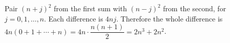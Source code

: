 Pair $(n+j)^2$ from the first sum with $(n-j)^2$ from the second, for $j=0,1,\ldots,n$. Each difference is $4nj$. Therefore the whole difference is $4n(0+1+\cdots+n)=4n\cdot\dfrac{n(n+1)}{2}=2n^3+2n^2$.
